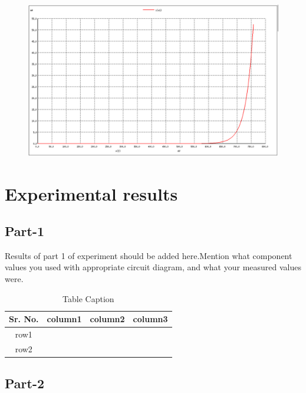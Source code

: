 \documentclass[12pt]{article}
\begin{document}
\begin{figure}[h!]

\centering
\includegraphics[scale = 0.2]{normaldiode.png}
\end{figure}
  \newpage


\section{Experimental results}

\subsection{Part-1}

Results of part 1 of experiment should be added here.Mention what component values you used with appropriate circuit diagram, and what your measured values were.

\begin{table}[!hbt]
		\begin{center}
		\caption{Table Caption}
		\begin{tabular}{|c|c|c|c|}
			\hline
			Sr. No. & column1 & column2 & column3\\
			\hline
			row1 &  &  & \\
			\hline
			row2 &  &  & \\
			\hline
            
		\end{tabular}
		\end{center}
\end{table}


\subsection{Part-2}
\end{document}
